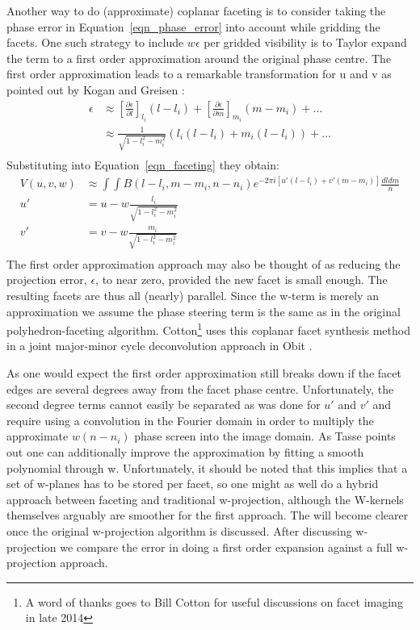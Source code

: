 Another way to do (approximate) coplanar faceting is to consider taking the phase error in Equation~\ref{eqn_phase_error} into account while gridding the facets.
One such strategy to include $w\epsilon$ per gridded visibility is to Taylor expand the term to a first order approximation around the original phase centre. The 
first order approximation leads to a remarkable transformation for u and v as pointed out by Kogan and Greisen \cite{aipsfaceting}:
\begin{equation}
 \begin{split}
  \epsilon&\approx \left[\frac{\partial \epsilon}{\partial l}\right]_{l_i}(l - l_i) + \left[\frac{\partial \epsilon}{\partial m}\right]_{m_i}(m - m_i) + \dots\\
  &\approx \frac{1}{\sqrt{1-l_i^2-m_i^2}}(l_i(l - l_i) + m_i(l - l_i)) + \dots\\
 \end{split}
\end{equation}
Substituting into Equation~\ref{eqn_faceting} they obtain:
\begin{equation}
 \begin{split}
  V(u,v,w)&\approx\int{\int{B(l-l_i,m-m_i,n-n_i)e^{-2{\pi}i[u'(l-l_i)+v'(m-m_i)]}\frac{dldm}{n}}}\\
  u'&=u - w\frac{l_i}{\sqrt{1-l_i^2-m_i^2}}\\
  v'&=v - w\frac{m_i}{\sqrt{1-l_i^2-m_i^2}}\\
 \end{split}
\end{equation}
The first order approximation approach may also be thought of as reducing the projection error, $\epsilon$, to near zero, provided the new facet is small enough. 
The resulting facets are thus all (nearly) parallel. Since the w-term is merely an approximation we assume the phase steering term is the same as in the original
polyhedron-faceting algorithm. Cotton\footnote{A word of thanks goes to Bill Cotton for useful discussions on facet imaging in late 2014} 
uses this coplanar facet synthesis method in a joint major-minor cycle deconvolution approach in Obit \cite{obitfacetclean}.

As one would expect the first order approximation still breaks down if the facet edges are several degrees away from the facet phase centre.
Unfortunately, the second degree terms cannot easily be separated as was done for $u'$ and $v'$ and require using a convolution in the Fourier domain
in order to multiply the approximate $w(n-n_i)$ phase screen into the image domain. As Tasse \cite{tassefaceting} points out one can additionally improve the approximation
by fitting a smooth polynomial through w. Unfortunately, it should be noted that this implies that a set of w-planes has to be stored per facet, so one might
as well do a hybrid approach between faceting and traditional w-projection, although the W-kernels themselves arguably are smoother for the first approach. The will 
become clearer once the original w-projection algorithm is discussed. After discussing w-projection we compare the error in doing a first 
order expansion against a full w-projection approach. 
